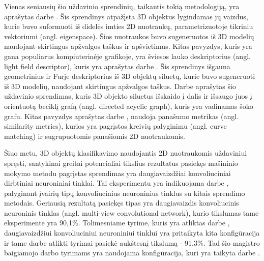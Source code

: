 Vienas seniausių šio uždavinio sprendinių, taikantis tokią metodologiją, yra aprašytas darbe \cite{prevWparEig}. Šis sprendinys atpažįsta 3D objektus lygindamas jų vaizdus, kurie buvo suformuoti iš didelės imties 2D nuotraukų, parametrizuotoje tikriniu vektoriumi (angl. eigenspace). Šios nuotraukos buvo sugeneruotos iš 3D modelių naudojant skirtingus apžvalgos taškus ir apšvietimus. Kitas pavyzdys, kuris yra gana populiarus kompiuterinėje grafikoje, yra šviesos lauko deskriptorius (angl. light field descriptor), kuris yra aprašytas darbe \cite{prevWLightFld}. Šis sprendinys išgauna geometrinius ir Furje deskriptorius iš 3D objektų siluetų, kurie buvo sugeneruoti iš 3D modelių, naudojant skirtingus apžvalgos taškus. Darbe \cite{prevWShockGraph} aprašytas šio uždavinio sprendimas, kuris 3D objekto siluetus išskaido į dalis ir išsaugo juos į orientuotą beciklį grafą (angl. directed acyclic graph), kuris yra vadinamas šoko grafu. Kitas pavyzdys aprašytas darbe \cite{prevWSimMet}, naudoja panašumo metrikas (angl. similarity metrics), kurios yra pagrįstos kreivių palyginimu (angl. curve matching) ir sugrupuotomis panašiomis 2D nuotraukomis.

Šiuo metu, 3D objektų klasifikavimo naudojantis 2D nuotraukomis uždaviniui spręsti, santykinai greitai potencialiai tikslius rezultatus pasiekęs mašininio mokymo metodu pagrįstas sprendimas yra daugiavaizdžiai konvoliuciniai dirbtiniai neuroniniai tinklai. Tai eksperimentu yra indikuojama darbe \cite{cnnExp1}, palyginant įvairių tipų konvoliucinius neuroninius tinklus su kitais sprendimo metodais. Geriausią rezultatą pasiekęs tipas yra daugiavaizdis konvoliucinis neuroninis tinklas (angl. multi-view convolutional network), kurio tikslumas tame eksperimente yra 90,1\%. Tolimesniame tyrime, kuris yra atliktas darbe \cite{cnnExp2}, daugiavaizdžiui konvoliuciniui neuroniniui tinklui yra pritaikyta kita konfigūracija ir tame darbe atlikti tyrimai pasiekė aukštesnį tikslumą - 91.3\%. Tad šio magistro baigiamojo darbo tyrimams yra naudojama konfigūracija, kuri yra taikyta darbe \cite{cnnExp2}.